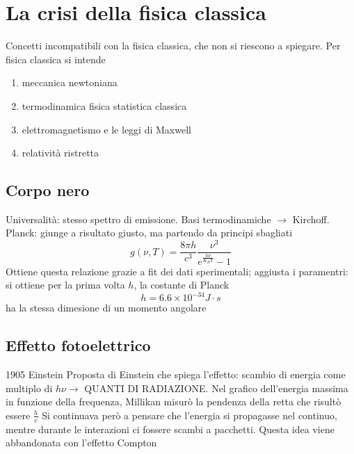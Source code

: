 \chapter{La crisi della fisica classica}

Concetti incompatibili con la fisica classica, che non si riescono a spiegare. Per fisica classica si intende
\begin{enumerate}
    \item meccanica newtoniana
    \item termodinamica fisica statistica classica
    \item elettromagnetismo e le leggi di Maxwell
    \item relatività ristretta
\end{enumerate}

\section{Corpo nero}

Universalità: stesso spettro di emissione. Basi termodinamiche $\rightarrow$ Kirchoff.  Planck: giunge a risultato giusto, ma partendo da principi sbagliati
\begin{equation*}
    g(\nu, T) = \frac{8\pi h}{c^3} \frac{\nu^3}{e^{\frac{h\nu}{K_B T}}-1}
\end{equation*}
Ottiene questa relazione grazie a fit dei dati sperimentali; aggiusta i paramentri: si ottiene per la prima volta $h$, la costante di Planck
\begin{equation}
    h = 6.6 \times 10^{-34} J \cdot s
\end{equation}
ha la stessa dimesione di un momento angolare

\section{Effetto fotoelettrico}

1905 Einstein \newline
Proposta di Einstein che spiega l'effetto: scambio di energia come multiplo di $h\nu \rightarrow$ QUANTI DI RADIAZIONE. \newline
Nel grafico dell'energia massima in funzione della frequenza, Millikan misurò la pendenza della retta che risultò essere $\frac{h}{e}$
Si continuava però a pensare che l'energia si propagasse nel continuo, mentre durante le interazioni ci fossere scambi a pacchetti. Questa idea viene abbandonata con l'effetto Compton

